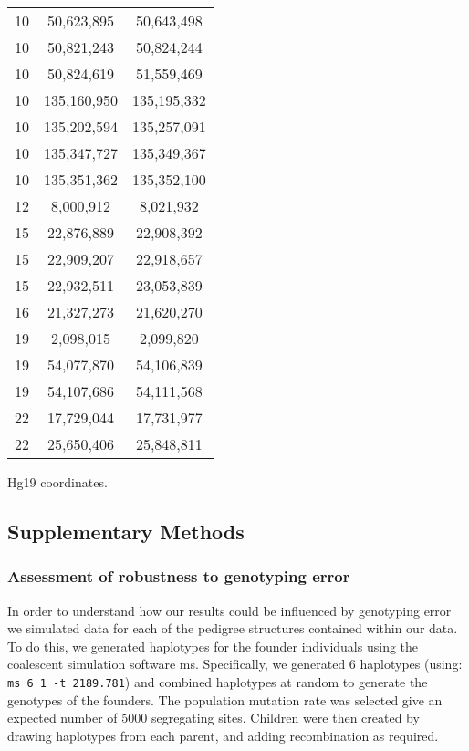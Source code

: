 \begin{table}[!h]
\begin{tabular}{|ccc|}
10 & 50,623,895 & 50,643,498 \\
10 & 50,821,243 & 50,824,244 \\
10 & 50,824,619 & 51,559,469 \\
10 & 135,160,950 & 135,195,332 \\
10 & 135,202,594 & 135,257,091 \\
10 & 135,347,727 & 135,349,367 \\
10 & 135,351,362 & 135,352,100 \\
12 & 8,000,912 & 8,021,932 \\
15 & 22,876,889 & 22,908,392 \\
15 & 22,909,207 & 22,918,657 \\
15 & 22,932,511 & 23,053,839 \\
16 & 21,327,273 & 21,620,270 \\
19 & 2,098,015 & 2,099,820 \\
19 & 54,077,870 & 54,106,839 \\
19 & 54,107,686 & 54,111,568 \\
22 & 17,729,044 & 17,731,977 \\
22 & 25,650,406 & 25,848,811 \\
    \hline \end{tabular}
     {
            Hg19 coordinates.  
    \label{tab:cointTS8}}
\end{table}

\clearpage

\subsection{Supplementary Methods}

\subsubsection{Assessment of robustness to genotyping error}

In order to understand how our results could be influenced by genotyping  
error we simulated data for each of the pedigree structures contained within our  
data.  To do this, we generated haplotypes for the founder individuals using the  
coalescent simulation software ms\cite{Hudson2002}.  Specifically, we generated 6 haplotypes (using:  
\verb|ms 6 1 -t 2189.781|) and combined haplotypes at random to generate the genotypes  
of the founders.  The population mutation rate was selected give an expected  
number of 5000 segregating sites. Children were then created by drawing  
haplotypes from each parent, and adding recombination as required.   

